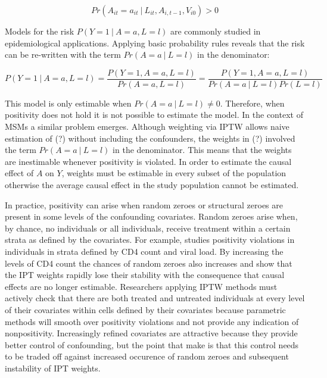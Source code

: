 \documentclass[11pt]{article}
\begin{document}
\[Pr(A_{it}=a_{it}\ |\ L_{it}, A_{i, t-1}, V_{i0}) > 0\]

Models for the risk \(P(Y=1\ |\ A=a, L=l)\) are commonly studied in
epidemiological applications. Applying basic probability rules reveals
that the risk can be re-written with the term \(Pr(A=a\ |\ L=l)\) in the
denominator:

\[P(Y=1\ |\ A=a, L=l) = \frac{P(Y=1, A=a, L=l)}{Pr(A=a, L=l)} = \frac{P(Y=1, A=a, L=l)}{Pr(A=a\ |\ L=l)Pr(L=l)}\]

This model is only estimable when \(Pr(A=a\ |\ L=l) \neq 0\). Therefore,
when positivity does not hold it is not possible to estimate the model.
In the context of MSMs a similar problem emerges. Although weighting via
IPTW allows naive estimation of (?) without including the confounders,
the weights in (?) involved the term \(Pr(A=a\ |\ L=l)\) in the
denominator. This means that the weights are inestimable whenever
positivity is violated. In order to estimate the causal effect of \(A\)
on \(Y\), weights must be estimable in every subset of the population
otherwise the average causal effect in the study population cannot be
estimated. \linebreak

In practice, positivity can arise when random zeroes or structural
zeroes are present in some levels of the confounding covariates. Random
zeroes arise when, by chance, no individuals or all individuals, receive
treatment within a certain strata as defined by the covariates. For
example, \citet{Cole2008} studies positivity violations in individuals
in strata defined by CD4 count and viral load. By increasing the levels
of CD4 count the chances of random zeroes also increases and
\citet{Cole2008} show that the IPT weights rapidly lose their stability
with the consequence that causal effects are no longer estimable.
Researchers applying IPTW methods must actively check that there are
both treated and untreated individuals at every level of their
covariates within cells defined by their covariates because parametric
methods will smooth over positivity violations and not provide any
indication of nonpositivity. Increasingly refined covariates are
attractive because they provide better control of confounding, but the
point that \citet{Cole2008} make is that this control needs to be traded
off against increased occurence of random zeroes and subsequent
instability of IPT weights. \linebreak
\end{document}
